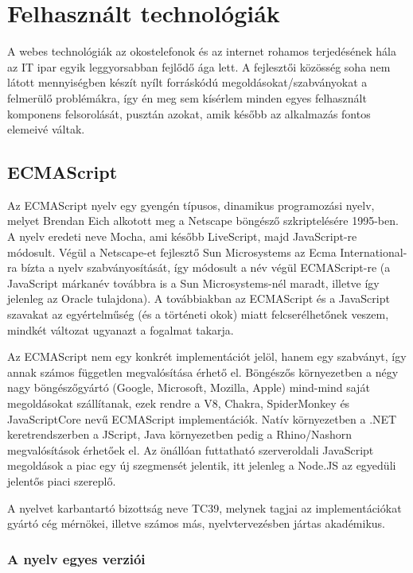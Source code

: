 \chapter{Felhasznált technológiák}

A webes technológiák az okostelefonok és az internet rohamos terjedésének hála
az IT ipar egyik leggyorsabban fejlődő ága lett.  A fejlesztői közösség soha nem
látott mennyiségben készít nyílt forráskódú megoldásokat/szabványokat a
felmerülő problémákra, így én meg sem kísérlem minden egyes felhasznált
komponens felsorolását, pusztán azokat, amik később az alkalmazás fontos
elemeivé váltak.

\section{ECMAScript}

Az ECMAScript nyelv egy gyengén típusos, dinamikus programozási nyelv, melyet
Brendan Eich alkotott meg a Netscape böngésző szkriptelésére
1995-ben\cite{JSAnnounce}.  A nyelv eredeti neve Mocha, ami később LiveScript,
majd JavaScript-re módosult.  Végül a Netscape-et fejlesztő Sun Microsystems az
Ecma International-ra bízta a nyelv szabványosítását, így módosult a név végül
ECMAScript-re (a JavaScript márkanév továbbra is a Sun Microsystems-nél maradt,
illetve így jelenleg az Oracle tulajdona). A továbbiakban az ECMAScript és a
JavaScript szavakat az egyértelműség (és a történeti okok) miatt
felcserélhetőnek veszem, mindkét változat ugyanazt a fogalmat takarja.

Az ECMAScript nem egy konkrét implementációt jelöl, hanem egy
szabványt\cite{es2016}, így annak számos független megvalósítása érhető el.
Böngészős környezetben a négy nagy böngészőgyártó (Google, Microsoft, Mozilla,
Apple) mind-mind saját megoldásokat szállítanak, ezek rendre a V8\cite{v8},
Chakra\cite{chakra}, SpiderMonkey\cite{spidermonkey} és
JavaScriptCore\cite{javascriptcore} nevű ECMAScript implementációk.  Natív
környezetben a .NET keretrendszerben a JScript, Java környezetben pedig a
Rhino/Nashorn megvalósítások érhetőek el.  Az önállóan futtatható szerveroldali
JavaScript megoldások a piac egy új szegmensét jelentik, itt jelenleg a Node.JS
az egyedüli jelentős piaci szereplő.

A nyelvet karbantartó bizottság neve TC39\cite{tc39}, melynek tagjai az
implementációkat gyártó cég mérnökei, illetve számos más, nyelvtervezésben
jártas akadémikus.

\subsection{A nyelv egyes verziói}


